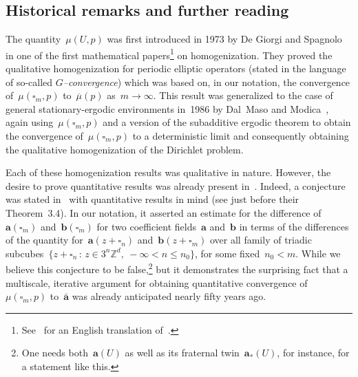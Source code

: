 \documentclass[11pt]{article} %
\let\oldsquare\square %
\renewcommand{\square}{\oldsquare}
\numberwithin{equation}{section}
\theoremstyle{definition}
\newcommand*{\Zd}{\ensuremath{\mathbb{Z}^d}}
\renewcommand{\b}{\ensuremath{\mathbf{b}}}
\renewcommand{\a}{\mathbf{a}}
\newcommand{\ahom}{\bar{\a}}
\newcommand{\cu}{\square}
\begin{document}
\subsection*{Historical remarks and further reading}

The quantity~$\mu(U,p)$ was first introduced in 1973 by De Giorgi and Spagnolo~\cite{DGS} in one of the first mathematical papers\footnote{See~\cite[pp. 361--379]{DG} for an English translation of~\cite{DGS}.}
on homogenization. They proved the qualitative homogenization for periodic elliptic operators (stated in the language of so-called \emph{$G$--convergence}) which was based on, in our notation,  
the convergence of~$\mu(\cu_m,p)$ to~$\overline{\mu}(p)$ as~$m\to \infty$. 
This result was generalized to the case of general stationary-ergodic environments in~1986 by Dal~Maso and Modica~\cite{DM1,DM2}, again using~$\mu(\cu_m,p)$ and a version of the subadditive ergodic theorem to obtain the convergence of~$\mu(\cu_m,p)$ to a deterministic limit and consequently obtaining the qualitative homogenization of the Dirichlet problem. 

\smallskip

Each of these homogenization results was qualitative in nature. However, the desire to prove quantitative results was already present in~\cite{DGS}. Indeed, a conjecture was stated in~\cite{DGS} with quantitative results in mind (see just before their Theorem~3.4). In our notation, it asserted an estimate for the difference of~$\a(\cu_m)$ and~$\b(\cu_m)$ for two coefficient fields~$\a$ and~$\b$ in terms of the differences of the quantity for~$\a(z+\cu_n)$ and~$\b(z+\cu_m)$ over all family of triadic subcubes~$\{ z+ \cu_n\,:\, z\in 3^n\Zd, \ -\infty < n \leq n_0\}$, for some fixed~$n_0 < m$. 
While we believe this conjecture to be false,\footnote{One needs both~$\a(U)$ as well as its fraternal twin~$\a_*(U)$, for instance, for a statement like this.} 
but it demonstrates the surprising fact that a multiscale, iterative argument for obtaining quantitative convergence of~$\mu(\cu_m,p)$ to~$\ahom$ was already anticipated nearly fifty years ago. 

\smallskip
\end{document}
